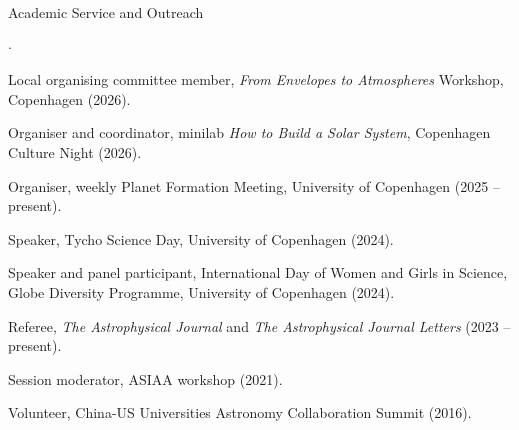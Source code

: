 \documentclass{resume} %
\newenvironment{compactcvlist}{%
  \begin{list}{$\cdot$}{%
    \setlength{\leftmargin}{0pt}%
    \setlength{\labelwidth}{0.6em}%
    \setlength{\labelsep}{0.5em}%
    \setlength{\itemsep}{2pt}%
    \setlength{\parsep}{0pt}%
    \setlength{\topsep}{3pt}%
    \setlength{\partopsep}{0pt}%
  }%
}{\end{list}}
\begin{document}
\begin{rSection}{Academic Service and Outreach}
\begin{compactcvlist}
\item Local organising committee member, \emph{From Envelopes to Atmospheres} Workshop, Copenhagen (2026).
\item Organiser and coordinator, minilab \emph{How to Build a Solar System}, Copenhagen Culture Night (2026).
\item Organiser, weekly Planet Formation Meeting, University of Copenhagen (2025 -- present).
\item Speaker, Tycho Science Day, University of Copenhagen (2024).
\item Speaker and panel participant, International Day of Women and Girls in Science, Globe Diversity Programme, University of Copenhagen (2024).
\item Referee, \emph{The Astrophysical Journal} and \emph{The Astrophysical Journal Letters} (2023 -- present).
\item Session moderator, ASIAA workshop (2021).
\item Volunteer, China-US Universities Astronomy Collaboration Summit (2016).
\end{compactcvlist}
\end{rSection}
\end{document}
